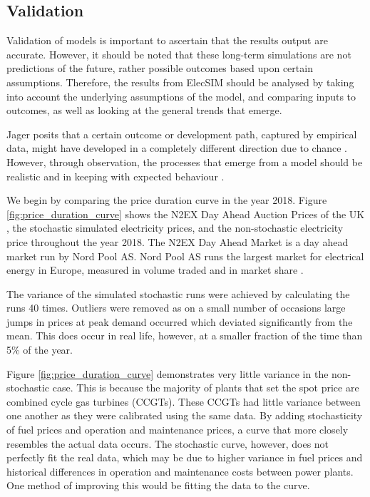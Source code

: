 
\subsection{Validation} Validation of models is important to ascertain that the results output are accurate. However, it should be noted that these long-term simulations are not predictions of the future, rather possible outcomes based upon certain assumptions. Therefore, the results from ElecSIM should be analysed by taking into account the underlying assumptions of the model, and comparing inputs to outcomes, as well as looking at the general trends that emerge.

Jager posits that a certain outcome or development path, captured by empirical data, might have developed in a completely different direction due to chance \cite{Jager2006a}. However, through observation, the processes that emerge from a model should be realistic and in keeping with expected behaviour \cite{Jager2006}.

We begin by comparing the price duration curve in the year 2018. Figure \ref{fig:price_duration_curve} shows the N2EX Day Ahead Auction Prices of the UK \cite{nordpool_2019}, the stochastic simulated electricity prices, and the non-stochastic electricity price throughout the year 2018. The N2EX Day Ahead Market is a day ahead market run by Nord Pool AS. Nord Pool AS runs the largest market for electrical energy in Europe, measured in volume traded and in market share \cite{nordpool_2019}.

The variance of the simulated stochastic runs were achieved by calculating the runs 40 times. Outliers were removed as on a small number of occasions large jumps in prices at peak demand occurred which deviated significantly from the mean. This does occur in real life, however, at a smaller fraction of the time than 5\% of the year.

Figure \ref{fig:price_duration_curve} demonstrates very little variance in the non-stochastic case. This is because the majority of plants that set the spot price are combined cycle gas turbines (CCGTs). These CCGTs had little variance between one another as they were calibrated using the same data. By adding stochasticity of fuel prices and operation and maintenance prices, a curve that more closely resembles the actual data occurs. The stochastic curve, however, does not perfectly fit the real data, which may be due to higher variance in fuel prices and historical differences in operation and maintenance costs between power plants. One method of improving this would be fitting the data to the curve.

